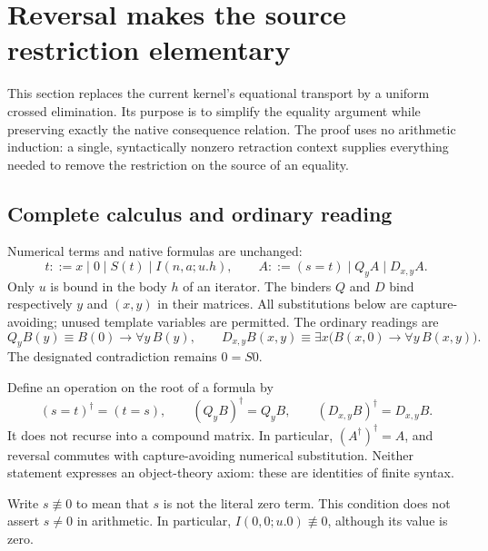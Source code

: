 \documentclass[11pt,letterpaper]{article}
\theoremstyle{definition}\newtheorem{definition}[theorem]{Definition}
\theoremstyle{remark}\newtheorem{remark}[theorem]{Remark}
\begin{document}
\clearpage
\setcounter{tocdepth}{1}
\begingroup\small\setlength{\parskip}{0pt}\tableofcontents\endgroup
\clearpage


\section{Reversal makes the source restriction elementary}
\label{rev:section}

This section replaces the current kernel's equational transport by a
uniform crossed elimination. Its purpose is to simplify the equality
argument while preserving exactly the native consequence relation. The
proof uses no arithmetic induction: a single, syntactically nonzero
retraction context supplies everything needed to remove the restriction
on the source of an equality.

\subsection{Complete calculus and ordinary reading}

Numerical terms and native formulas are unchanged:
\[
 t::=x\mid0\mid S(t)\mid I(n,a;u.h),
 \qquad
 A::=(s=t)\mid Q_yA\mid D_{x,y}A.
\]
Only $u$ is bound in the body $h$ of an iterator. The binders $Q$ and $D$
bind respectively $y$ and $(x,y)$ in their matrices. All substitutions
below are capture-avoiding; unused template variables are permitted.
The ordinary readings are
\[
 Q_yB(y)\equiv B(0)\to\forall y\,B(y),\qquad
 D_{x,y}B(x,y)\equiv
 \exists x\bigl(B(x,0)\to\forall y\,B(x,y)\bigr).
\]
The designated contradiction remains $0=S0$.

Define an operation on the root of a formula by
\[
 (s=t)^\dagger=(t=s),\qquad
 (Q_yB)^\dagger=Q_yB,\qquad
 (D_{x,y}B)^\dagger=D_{x,y}B.
 \tag{Reversal}\label{rev:rho}
\]
It does not recurse into a compound matrix. In particular,
$(A^\dagger)^\dagger=A$, and reversal commutes with capture-avoiding
numerical substitution. Neither statement expresses an object-theory
axiom: these are identities of finite syntax.

Write $s\not\equiv0$ to mean that $s$ is not the literal zero term.
This condition does not assert $s\ne0$ in arithmetic. In particular,
$I(0,0;u.0)\not\equiv0$, although its value is zero.
\end{document}
